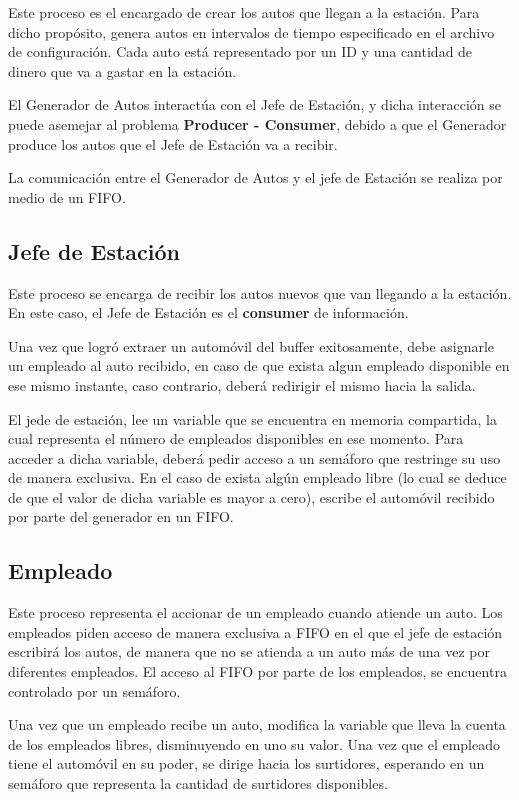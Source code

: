 \documentclass[12pt,a4paper,spanish]{article}
\begin{document}
		Este proceso es el encargado de crear los autos que llegan a la estación. Para
		dicho propósito, genera autos en intervalos de tiempo especificado en el archivo de configuración. 
		Cada auto está representado por un ID y una cantidad de dinero que va a gastar en la estación.

		El Generador de Autos interactúa con el Jefe de Estación, y dicha interacción se puede
		asemejar al problema \textbf{Producer - Consumer}, debido a que el Generador produce
		los autos que el Jefe de Estación va a recibir. 

		La comunicación entre el Generador de Autos y el jefe de Estación se realiza por medio de un
		FIFO.


	\subsection{Jefe de Estación}
		Este proceso se encarga de recibir los autos nuevos que van llegando a la estación. 
		En este caso, el Jefe de Estación es el \textbf{consumer} de información.

		Una vez que logró extraer un automóvil del buffer exitosamente, debe asignarle 
		un empleado al auto recibido, en caso de que exista algun empleado disponible 
		en ese mismo instante, caso contrario, deberá redirigir el mismo hacia la salida.
		
		El jede de estación, lee un variable que se encuentra en memoria compartida, la cual
		representa el número de empleados disponibles en ese momento. Para acceder a dicha variable,
		deberá pedir acceso a un semáforo que restringe su uso de manera exclusiva.
		En el caso de exista algún empleado libre (lo cual se deduce de que el valor de dicha variable
		es mayor a cero), escribe el automóvil recibido por parte del generador en un FIFO.


	\subsection{Empleado}
	
		Este proceso representa el accionar de un empleado cuando atiende un auto. Los empleados piden acceso
		de manera exclusiva a FIFO en el que el jefe de estación escribirá los autos, de manera que no se
		atienda a un auto más de una vez por diferentes empleados. El acceso al FIFO por parte de los empleados,
		se encuentra controlado por un semáforo. 

		Una vez que un empleado recibe un auto, modifica la variable que lleva la cuenta de los empleados libres, 
		disminuyendo en uno su valor. Una vez que el empleado tiene el automóvil en su poder, se dirige hacia los
		surtidores, esperando en un semáforo que representa la cantidad de surtidores disponibles. 
\end{document}
